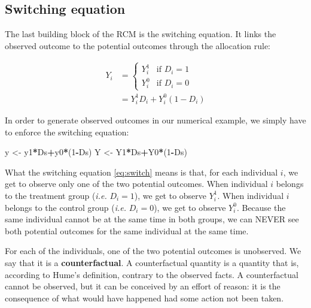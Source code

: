 \documentclass[]{book}
\newenvironment{Shaded}{\begin{snugshade}}{\end{snugshade}}
\newcommand{\DecValTok}[1]{\textcolor[rgb]{0.00,0.00,0.81}{#1}}
\newcommand{\StringTok}[1]{\textcolor[rgb]{0.31,0.60,0.02}{#1}}
\newcommand{\OperatorTok}[1]{\textcolor[rgb]{0.81,0.36,0.00}{\textbf{#1}}}
\newcommand{\NormalTok}[1]{#1}
\theoremstyle{definition}
\theoremstyle{definition}
\theoremstyle{definition}
\theoremstyle{remark}
\let\BeginKnitrBlock\begin \let\EndKnitrBlock\end
\begin{document}
\subsection{Switching equation}\label{switching-equation}

The last building block of the RCM is the switching equation. It links
the observed outcome to the potential outcomes through the allocation
rule:

\begin{align}
 \label{eq:switch}
  Y_i & = 
    \begin{cases}
    Y_i^1 & \text{if } D_i=1\\
    Y_i^0 & \text{if } D_i=0
    \end{cases} \\
    & = Y_i^1D_i + Y_i^0(1-D_i) \nonumber
\end{align}

\BeginKnitrBlock{example}
\protect\hypertarget{exm:unnamed-chunk-4}{}{\label{exm:unnamed-chunk-4} }In
order to generate observed outcomes in our numerical example, we simply
have to enforce the switching equation:
\EndKnitrBlock{example}

\begin{Shaded}
\begin{Highlighting}[]
\NormalTok{y <-}\StringTok{ }\NormalTok{y1}\OperatorTok{*}\NormalTok{Ds}\OperatorTok{+}\NormalTok{y0}\OperatorTok{*}\NormalTok{(}\DecValTok{1}\OperatorTok{-}\NormalTok{Ds)}
\NormalTok{Y <-}\StringTok{ }\NormalTok{Y1}\OperatorTok{*}\NormalTok{Ds}\OperatorTok{+}\NormalTok{Y0}\OperatorTok{*}\NormalTok{(}\DecValTok{1}\OperatorTok{-}\NormalTok{Ds)}
\end{Highlighting}
\end{Shaded}

What the switching equation \eqref{eq:switch} means is that, for each
individual \(i\), we get to observe only one of the two potential
outcomes. When individual \(i\) belongs to the treatment group
(\emph{i.e.} \(D_i=1\)), we get to observe \(Y_i^1\). When individual
\(i\) belongs to the control group (\emph{i.e.} \(D_i=0\)), we get to
observe \(Y_i^0\). Because the same individual cannot be at the same
time in both groups, we can NEVER see both potential outcomes for the
same individual at the same time.

For each of the individuals, one of the two potential outcomes is
unobserved. We say that it is a \textbf{counterfactual}. A
counterfactual quantity is a quantity that is, according to Hume's
definition, contrary to the observed facts. A counterfactual cannot be
observed, but it can be conceived by an effort of reason: it is the
consequence of what would have happened had some action not been taken.
\end{document}
